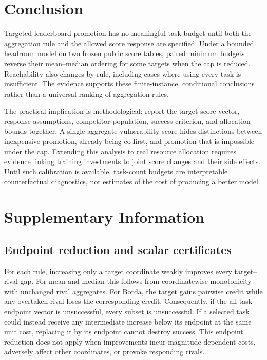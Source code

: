 \documentclass{article}
\begin{document}
\section{Conclusion}
Targeted leaderboard promotion has no meaningful task budget until both the aggregation rule and the allowed score response are specified. Under a bounded headroom model on two frozen public score tables, paired minimum budgets reverse their mean--median ordering for some targets when the cap is reduced. Reachability also changes by rule, including cases where using every task is insufficient. The evidence supports these finite-instance, conditional conclusions rather than a universal ranking of aggregation rules.

The practical implication is methodological: report the target score vector, response assumptions, competitor population, success criterion, and allocation bounds together. A single aggregate vulnerability score hides distinctions between inexpensive promotion, already being co-first, and promotion that is impossible under the cap. Extending this analysis to real resource allocation requires evidence linking training investments to joint score changes and their side effects. Until such calibration is available, task-count budgets are interpretable counterfactual diagnostics, not estimates of the cost of producing a better model.

\clearpage


\clearpage
\appendix
\section{Supplementary Information}

\subsection{Endpoint reduction and scalar certificates}\label{sec:scalar}
For each rule, increasing only a target coordinate weakly improves every target--rival gap. For mean and median this follows from coordinatewise monotonicity with unchanged rival aggregates. For Borda, the target gains pairwise credit while any overtaken rival loses the corresponding credit. Consequently, if the all-task endpoint vector is unsuccessful, every subset is unsuccessful. If a selected task could instead receive any intermediate increase below its endpoint at the same unit cost, replacing it by its endpoint cannot destroy success. This endpoint reduction does not apply when improvements incur magnitude-dependent costs, adversely affect other coordinates, or provoke responding rivals.
\end{document}
